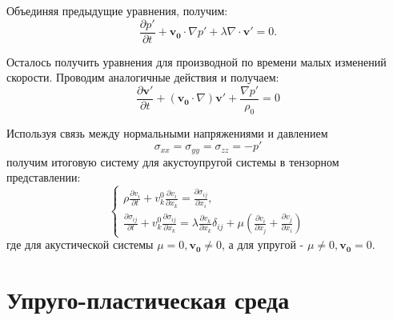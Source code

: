 \documentclass[12pt,a4paper, titlepage, openany]{book}
\begin{document}
\par
Объединяя предыдущие уравнения, получим:
\begin{equation}
\frac{\partial p '}{\partial t} + \mathbf{v_0} \cdot \nabla p' + \lambda \nabla \cdot \mathbf{v'} = 0.
\end{equation}
\par
Осталось получить уравнения для производной по времени малых изменений скорости. Проводим аналогичные действия и получаем:
\begin{equation}
\frac{\partial \mathbf{v'}}{\partial t} + (\mathbf{v_0} \cdot \nabla) \mathbf{v'} + \frac{\nabla p'}{\rho_0} = 0
\end{equation}
\par
Используя связь между нормальными напряжениями и давлением 
\begin{equation}
\sigma_{xx} = \sigma_{yy} = \sigma_{zz} = -p'
\end{equation}
получим итоговую систему для акустоупругой системы в тензорном представлении:
\begin{equation}
\begin{cases}
\rho \frac{\partial v_i}{\partial t} + v^0_k \frac{\partial v_i}{\partial x_k} = \frac{\partial \sigma_{ij}}{\partial x_i}, \\
\frac{\partial \sigma_{ij}}{\partial t} + v^0_k \frac{\partial \sigma_{ij}}{\partial x_k} = \lambda \frac{\partial  v_k}{\partial x_k} \delta_{ij} + \mu (\frac{\partial v_i}{\partial x_j} + \frac{\partial v_j}{\partial x_i})
\end{cases}
\end{equation}
где для акустической системы  $\mu = 0, \mathbf{v_0} \neq 0$, а для упругой - $\mu \neq 0, \mathbf{v_0} =  0$.









\section{Упруго-пластическая среда}
\label{sec:2.3}
\end{document}
